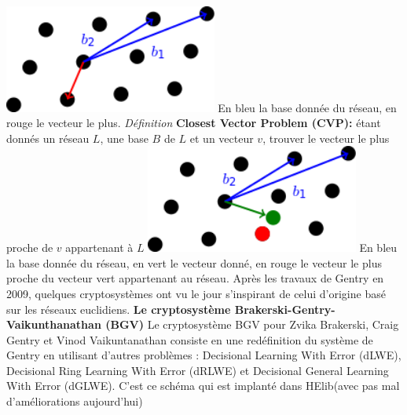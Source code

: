 \documentclass[a4paper,11pt]{report}
\begin{document}
\hspace*{3.5cm}{}\includegraphics[width=7cm]{svp.png}\newline
\newline
\hspace*{3.5cm} En bleu la base donnée du réseau, en rouge le vecteur le plus.\newline
\newline
\textit{Définition} \textbf{Closest Vector Problem (CVP):}\newline
étant donnés un réseau $L$, une base $B$ de $L$ et un vecteur $v$, trouver le vecteur le plus proche de $v$ appartenant à $L$\newline
\newline
\hspace*{5cm}{}\includegraphics[width=7cm]{cvp.png}\newline
\newline
\hspace*{3.5cm} En bleu la base donnée du réseau, en vert le vecteur donné,\newline
\hspace*{3.5cm} en rouge le vecteur le plus proche du vecteur vert appartenant au réseau.\newline
\newline
Après les travaux de Gentry en 2009, quelques cryptosystèmes ont vu le jour s’inspirant de celui d’origine basé sur les réseaux euclidiens.\newline
\textbf{Le cryptosystème Brakerski-Gentry-Vaikunthanathan (BGV)}\newline
Le cryptosystème BGV pour Zvika Brakerski, Craig Gentry et Vinod Vaikuntanathan consiste en une redéfinition du système de Gentry en
utilisant d’autres problèmes : Decisional Learning With Error (dLWE), Decisional Ring Learning With Error (dRLWE) et Decisional General Learning With Error (dGLWE). C’est ce schéma qui est implanté dans HElib(avec pas mal d’améliorations aujourd’hui)
\end{document}

